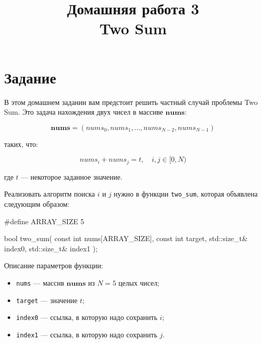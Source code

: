 \documentclass[14pt]{extarticle}
\title{Домашняя работа 3 \\ Two Sum}
\begin{document}
\maketitle

\tableofcontents

\section{Задание}

    В этом домашнем задании вам предстоит решить частный случай проблемы Two Sum.
    Это задача нахождения двух чисел в массиве $\mathbf{nums}$:

    \begin{equation}
\mathbf{nums} = (nums_0, nums_1, \dots , nums_{N-2}, nums_{N-1})
    \end{equation}

    таких, что:

    \begin{equation}
nums_i + nums_j = t, \quad i,j \in [0, N)
    \end{equation}

    где $t$ --- некоторое заданное значение.

    Реализовать алгоритм поиска $i$ и $j$ нужно в функции \verb|two_sum|,
    которая объявлена следующим образом:

    \begin{myinplacelisting}[minted language=cpp]
#define ARRAY_SIZE 5

bool two_sum(
    const int nums[ARRAY_SIZE],
    const int target,
    std::size_t& index0,
    std::size_t& index1
);
    \end{myinplacelisting}

    Описание параметров функции:

    \begin{itemize}

        \item \verb|nums| --- массив $\mathbf{nums}$ из $N = 5$ целых чисел;

        \item \verb|target| --- значение $t$;

        \item \verb|index0| --- ссылка, в которую надо сохранить $i$;

        \item \verb|index1| --- ссылка, в которую надо сохранить $j$.

    \end{itemize}
\end{document}
